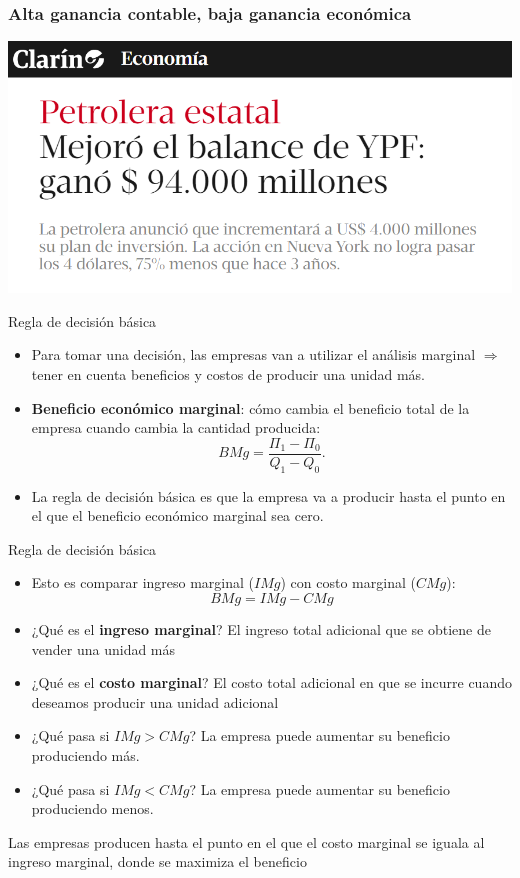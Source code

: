 \documentclass{beamer}
\begin{document}
\begin{frame}
\frametitle{Alta ganancia contable, baja ganancia económica}
\centering
\includegraphics[scale=0.6]{Slides Principios de Economia/YPF.png}
\end{frame}

\begin{frame}{Regla de decisión básica}

    \begin{itemize}
        \item Para tomar una decisión, las empresas van a utilizar el análisis marginal $\Rightarrow$ tener en cuenta beneficios y costos de producir una unidad más.
        \item \textbf{Beneficio económico marginal}: cómo cambia el beneficio total de la empresa cuando cambia la cantidad producida: \\
        \[
        BMg = \frac{\Pi_1 - \Pi_0}{Q_1 - Q_0}.
        \]
        \item La regla de decisión básica es que la empresa va a producir hasta el punto en el que el beneficio económico marginal sea cero.
    \end{itemize}
\end{frame}

\begin{frame}{Regla de decisión básica}
\begin{itemize}
\item Esto es comparar ingreso marginal ($IMg$) con costo marginal ($CMg$): 
        \[
        BMg = IMg - CMg
        \]
        \item ¿Qué es el \textbf{ingreso marginal}? El ingreso total adicional que se obtiene de vender una unidad más
        \item ¿Qué es el \textbf{costo marginal}? El costo total adicional en que se incurre cuando deseamos producir una unidad adicional
        \item ¿Qué pasa si $IMg > CMg$? La empresa puede aumentar su beneficio produciendo más.
        \item ¿Qué pasa si $IMg < CMg$? La empresa puede aumentar su beneficio produciendo menos.
    \end{itemize}
    \begin{boxB}
        \begin{center}
            Las empresas producen hasta el punto en el que el costo marginal se iguala al ingreso marginal, donde se maximiza el beneficio
        \end{center}
    \end{boxB}
\end{frame}
\end{document}
